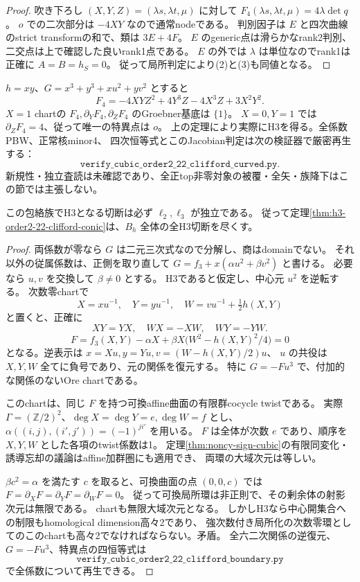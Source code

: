 \begin{proof}
吹き下ろし $(X,Y,Z)=(\lambda s,\lambda t,\mu)$ に対して
$F_4(\lambda s,\lambda t,\mu)=4\lambda\det q$。
$o$ での二次部分は $-4XY$ なので通常nodeである。
判別因子は $E$ と四次曲線のstrict transformの和で、類は $3E+4F$。
$E$ のgeneric点は滑らかなrank2判別、二交点は上で確認した良いrank1点である。
$E$ の外では $\lambda$ は単位なのでrank1は正確に $A=B=h_S=0$。
従って局所判定により(2)と(3)も同値となる。
\end{proof}

\begin{example}
$h=xy$、$G=x^3+y^3+xu^2+yv^2$ とすると
\[
 F_4=-4XYZ^2+4Y^3Z-4X^3Z+3X^2Y^2.
\]
$X=1$ chartの $F_4,\partial_YF_4,\partial_ZF_4$ のGroebner基底は $\{1\}$。
$X=0,Y=1$ では $\partial_ZF_4=4$、従って唯一の特異点は $o$。
上の定理により実際にH3を得る。全係数PBW、正常核minor4、
四次恒等式とこのJacobian判定は次の検証器で厳密再生する：
\[
\texttt{verify\_cubic\_order2\_22\_clifford\_curved.py}.
\]
新規性・独立査読は未確認であり、全正top非零対象の被覆・全矢・族降下はこの節では主張しない。
\end{example}

\begin{proposition}[依存係数境界は全て非H3]
\label{prop:h3-order2-22-clifford-dependent}
この包絡族でH3となる切断は必ず $\ell_2,\ell_3$ が独立である。
従って定理\ref{thm:h3-order2-22-clifford-conic}は、$B_h$ 全体の全H3切断を尽くす。
\end{proposition}
\begin{proof}
両係数が零なら $G$ は二元三次式なので分解し、商はdomainでない。
それ以外の従属係数は、正側を取り直して
$G=f_3+x(\alpha u^2+\beta v^2)$ と書ける。
必要なら $u,v$ を交換して $\beta\ne0$ とする。
H3であると仮定し、中心元 $u^2$ を逆転する。
次数零chartで
\[
 X=xu^{-1},\quad Y=yu^{-1},\quad
 W=vu^{-1}+\tfrac12h(X,Y)
\]
と置くと、正確に
\[
 XY=YX,\quad WX=-XW,\quad WY=-YW.
\]
\[
 F=f_3(X,Y)-\alpha X+\beta X\bigl(W^2-h(X,Y)^2/4\bigr)=0
\]
となる。逆表示は $x=Xu,y=Yu,v=(W-h(X,Y)/2)u$、
$u$ の共役は $X,Y,W$ 全てに負号であり、元の関係を復元する。
特に $G=-Fu^3$ で、付加的な関係のないOre chartである。

このchartは、同じ $F$ を持つ可換affine曲面の有限群cocycle twistである。
実際 $\Gamma=(\mathbb Z/2)^2$、$\deg X=\deg Y=e,\deg W=f$ とし、
$\alpha((i,j),(i',j'))=(-1)^{ji'}$ を用いる。
$F$ は全体が次数 $e$ であり、順序を $X,Y,W$ とした各項のtwist係数は1。
定理\ref{thm:noncy-sign-cubic}の有限同変化・誘導忘却の議論はaffine加群圏にも適用でき、
両環の大域次元は等しい。

$\beta c^2=\alpha$ を満たす $c$ を取ると、可換曲面の点 $(0,0,c)$ では
$F=\partial_XF=\partial_YF=\partial_WF=0$。
従って可換局所環は非正則で、その剰余体の射影次元は無限である。
chartも無限大域次元となる。
しかしH3なら中心開集合への制限もhomological dimension高々2であり、
強次数付き局所化の次数零環としてのこのchartも高々2でなければならない。矛盾。
全六二次関係の逆復元、$G=-Fu^3$、特異点の四恒等式は
\[
\texttt{verify\_cubic\_order2\_22\_clifford\_boundary.py}
\]
で全係数について再生できる。
\end{proof}

